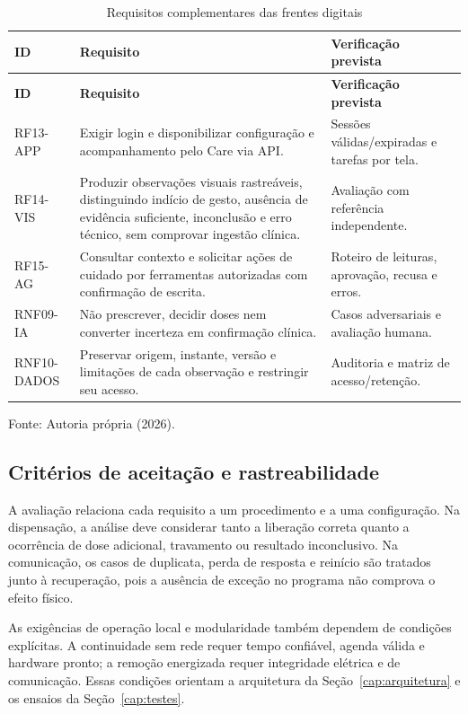 {\small\setlength{\tabcolsep}{3pt}\begin{longtable}{p{}p{}p{}}\caption{Requisitos complementares das frentes digitais}\label{tab:05-3}\\
\hline
\textbf{ID} & \textbf{Requisito} & \textbf{Verificação prevista}\\\hline
\endfirsthead\hline
\textbf{ID} & \textbf{Requisito} & \textbf{Verificação prevista}\\\hline
\endhead
RF13-APP & Exigir login e disponibilizar configuração e acompanhamento pelo Care via API. & Sessões válidas/expiradas e tarefas por tela.\\\hline
RF14-VIS & Produzir observações visuais rastreáveis, distinguindo indício de gesto, ausência de evidência suficiente, inconclusão e erro técnico, sem comprovar ingestão clínica. & Avaliação com referência independente.\\\hline
RF15-AG & Consultar contexto e solicitar ações de cuidado por ferramentas autorizadas com confirmação de escrita. & Roteiro de leituras, aprovação, recusa e erros.\\\hline
RNF09-IA & Não prescrever, decidir doses nem converter incerteza em confirmação clínica. & Casos adversariais e avaliação humana.\\\hline
RNF10-DADOS & Preservar origem, instante, versão e limitações de cada observação e restringir seu acesso. & Auditoria e matriz de acesso/retenção.\\\hline
\end{longtable}}{\small\noindent Fonte: Autoria própria (2026).\par}


\subsection{Critérios de aceitação e rastreabilidade}
A avaliação relaciona cada requisito a um procedimento e a uma configuração. Na dispensação, a análise deve considerar tanto a liberação correta quanto a ocorrência de dose adicional, travamento ou resultado inconclusivo. Na comunicação, os casos de duplicata, perda de resposta e reinício são tratados junto à recuperação, pois a ausência de exceção no programa não comprova o efeito físico.

As exigências de operação local e modularidade também dependem de condições explícitas. A continuidade sem rede requer tempo confiável, agenda válida e hardware pronto; a remoção energizada requer integridade elétrica e de comunicação. Essas condições orientam a arquitetura da Seção~\ref{cap:arquitetura} e os ensaios da Seção~\ref{cap:testes}.

